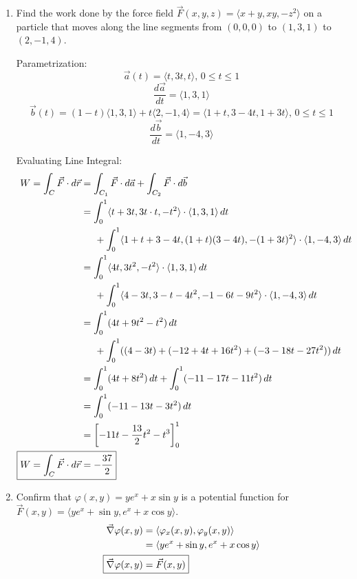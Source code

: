\documentclass{article}
\begin{document}
\begin{enumerate}
    \item Find the work done by the force field $\Vec{F}(x,y,z)=\langle x+y, xy,-z^2\rangle$ on a particle that moves along the line segments from $(0,0,0)$ to $(1,3,1)$ to $(2,-1,4)$.
    
Parametrization:
    $$\Vec{a}(t)=\langle t,3t,t\rangle,\, 0\le t\le 1 $$
    $$\frac{d\Vec{a}}{dt}=\langle 1,3,1\rangle$$
    $$\Vec{b}(t)=(1-t)\langle 1,3,1\rangle+t\langle 2,-1,4\rangle=\langle1+t,3-4t,1+3t\rangle,\,0\le t\le 1$$
    $$\frac{d\Vec{b}}{dt}=\langle 1,-4,3\rangle$$

Evaluating Line Integral:
    \begin{align*}
        W=\int_C \Vec{F}\cdot d\Vec{r}&=\int_{C_1} \Vec{F}\cdot d\Vec{a}+\int_{C_2} \Vec{F}\cdot d\Vec{b}\\
        &=\int_0^1 \langle t+3t,3t\cdot t,-t^2\rangle\cdot \langle 1,3,1\rangle \,dt\\
        &\hspace{0.5cm}+\int_0^1 \langle1+t+3-4t,(1+t)(3-4t),-(1+3t)^2\rangle\cdot \langle 1,-4,3\rangle\,dt\\
        &=\int_0^1 \langle4t,3t^2,-t^2\rangle\cdot \langle 1,3,1\rangle \,dt\\
        &\hspace{0.5cm}+\int_0^1 \langle4-3t,3-t-4t^2,-1-6t-9t^2\rangle\cdot \langle 1,-4,3\rangle\,dt\\
        &=\int_0^1 (4t+9t^2-t^2)\,dt\\
        &\hspace{0.5cm}+\int_0^1 ((4-3t)+(-12+4t+16t^2)+(-3-18t-27t^2))\,dt\\
        &=\int_0^1 (4t+8t^2)\,dt+\int_0^1 (-11-17t-11t^2)\,dt\\
        &=\int_0^1(-11-13t-3t^2)\,dt\\
        &=\left[-11t-\frac{13}{2}t^2-t^3\right]_0^1\\
\Aboxed{W=\int_C \Vec{F}\cdot d\Vec{r}&=-\frac{37}{2}}
    \end{align*}
    \item Confirm that $\varphi (x,y)=ye^x+x\sin y$ is a potential function for $\Vec{F}(x,y)=\langle ye^x + \sin y, e^x +x\cos y \rangle$.
    \begin{align*}
    \Vec{\nabla}\varphi (x,y)&= \langle\varphi_x(x,y),\varphi_y(x,y)\rangle\\
    &=\langle ye^x+\sin y,e^x+x\cos y\rangle\\
\Aboxed{\Vec{\nabla}\varphi (x,y)&=\Vec{F}(x,y)}
    \end{align*}

\end{enumerate}
\end{document}
